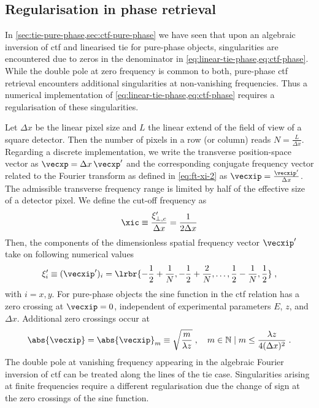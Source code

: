 \documentclass[
twoside,
openright,
titlepage,
numbers=noenddot,
headinclude,
fleqn,
a4paper,
footinclude=true,
cleardoublepage=empty,
abstractoff,
BCOR=5mm,
paper=a4,
fontsize=11pt,
british,ngerman,american,
]{scrreprt}
\begin{document}
\subsection{Regularisation in phase retrieval}
\label{sec:regularisation}

In \cref{sec:tie-pure-phase,sec:ctf-pure-phase} we have seen that upon
an algebraic inversion of \ac{ctf} and linearised \ac{tie} for
pure-phase objects, singularities are encountered due to zeros in the
denominator in \cref{eq:linear-tie-phase,eq:ctf-phase}.  While the
double pole at zero frequency is common to both, pure-phase
\ac{ctf} retrieval encounters additional singularities at
non-vanishing frequencies.  Thus a numerical implementation of
\cref{eq:linear-tie-phase,eq:ctf-phase} requires a regularisation of
these singularities.

Let $\Delta x$ be the linear pixel size and $L$ the linear extend of
the field of view of a square detector.  Then the number of pixels in
a row (or column) reads $N=\frac{L}{\Delta x}$.  Regarding a discrete
implementation, we write the transverse position-space vector as
$\vecxp = \Delta x \,\vecxp'$ and the corresponding conjugate
frequency vector related to the Fourier transform as defined in
\cref{eq:ft-xi-2} as $\vecxip=\frac{\vecxip'}{\Delta x}$.  The
admissible transverse frequency range is limited by half of the
effective size of a detector pixel.  We define the cut-off frequency
as
\begin{equation}
  \label{eq:cut-off-frequency-0}
  \xic \equiv \frac{\xi'_{\perp,c}}{\Delta x} = \frac{1}{2\Delta x}
\end{equation}
Then, the components of the dimensionless spatial frequency
vector $\vecxip'$ take on following numerical values
\begin{equation}
  \label{eq:xi-numeric}
  \xi'_i \equiv (\vecxip')_i =
  \lrbr{-\frac12+\frac{1}{N},-\frac12+\frac{2}{N},\dots,
    \frac12-\frac{1}{N},\frac12 } \;,
\end{equation}
with $i={x,y}$.  For pure-phase objects the sine function in the
\ac{ctf} relation has a zero crossing at $\vecxip=0$, independent of
experimental parameters $E$, $z$, and $\Delta x$.  Additional zero
crossings occur at
\begin{equation}
  \label{eq:sine-zeros-0}
  \abs{\vecxip} = \abs{\vecxip}_m
  \equiv\sqrt{\frac{m}{\lambda z}}
  \;,\quad m\in\mathbb{N} \;|\; m
  \le\frac{\lambda z}{4(\Delta x)^2} \;.
\end{equation}
The double pole at vanishing frequency appearing in the algebraic
Fourier inversion of \ac{ctf} can be treated along the lines of the
\ac{tie} case.  Singularities arising at finite frequencies require a
different regularisation due the change of sign at the zero crossings
of the sine function.
\end{document}
